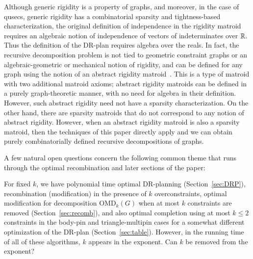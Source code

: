 \begin{openproblem}
\label{open:sparsitymatroid}
    Although generic rigidity is a property of graphs, and moreover,  in the case of qusecs, generic rigidity has a combinatorial sparsity and tightness-based characterization, the original definition of independence in the rigidity matroid requires an algebraic notion of independence of vectors of indeterminates over $\mathbb{R}$. Thus the definition of the DR-plan requires algebra over the reals.
    In fact, the recursive decomposition problem is not tied to geometric constraint graphs or an algebraic-geometric or mechanical notion of rigidity, and can be defined for any graph using the notion of an abstract rigidity matroid~\cite{graver93book}. This is a type of matroid with two additional matroid axioms; abstract rigidity matroids can be defined in a purely graph-theoretic manner,  with no need for algebra in their definition. However, such abstract rigidity need not have a sparsity characterization. On the other hand, there are sparsity matroids that do not correspond to any notion of abstract rigidity.
    However, when an abstract rigidity matroid is also a sparsity matroid, then the techniques of this paper directly apply and we can obtain purely combinatorially defined recursive decompositions of graphs.
\end{openproblem}


A few natural  open questions concern the following common theme that runs through the optimal recombination and later sections of the paper:

\begin{openproblem}
    For fixed $k$, we have
    polynomial time optimal DR-planning (Section~\ref{sec:DRP}),
    recombination (modification) in the presence of $k$ overconstraints,
    optimal modification for decomposition OMD$_k(G)$ when at most $k$ constraints are removed (Section~\ref{sec:recomb}),
    and also optimal completion using at most $k\le 2$ constraints in the body-pin and triangle-multipin cases for a somewhat different optimization of the DR-plan (Section~\ref{sec:table}).
    However, in the running time of all of these algorithms, $k$ appears in the exponent. Can $k$ be removed from the exponent?
\end{openproblem}

